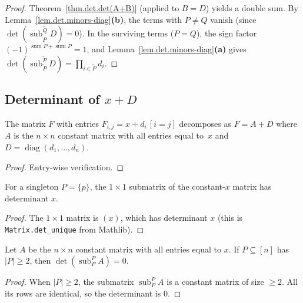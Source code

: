 \begin{proof}
Theorem~\ref{thm.det.det(A+B)} (applied to $B=D$) yields a double
sum. By Lemma~\ref{lem.det.minors-diag}\textbf{(b)}, the terms with
$P\ne Q$ vanish (since
$\det(\operatorname{sub}_{\widetilde{P}}^{\widetilde{Q}} D)=0$).
In the surviving terms ($P=Q$), the sign factor
$(-1)^{\operatorname{sum} P + \operatorname{sum} P} = 1$, and
Lemma~\ref{lem.det.minors-diag}\textbf{(a)} gives
$\det(\operatorname{sub}_{\widetilde{P}}^{\widetilde{P}} D)
= \prod_{i\in\widetilde{P}} d_i$.
\end{proof}

\subsection{Determinant of $x + D$}

\begin{lemma}
\label{lem.constPlusDiag.decomp}
\leanhelper
\leanok
The matrix $F$ with entries $F_{i,j} = x + d_i\,[i{=}j]$ decomposes as
$F = A + D$ where $A$ is the $n\times n$ constant matrix with all
entries equal to~$x$ and $D = \operatorname{diag}(d_1,\ldots,d_n)$.
\end{lemma}

\begin{proof}
\leanok
Entry-wise verification.
\end{proof}

\begin{lemma}
\label{lem.det.const.matrix.singleton}
\leanhelper
\leanok
For a singleton $P = \{p\}$, the $1\times 1$ submatrix of the
constant-$x$ matrix has determinant $x$.
\end{lemma}

\begin{proof}
\leanok
The $1\times 1$ matrix is $(x)$, which has determinant $x$
(this is \texttt{Matrix.det\_unique} from Mathlib).
\end{proof}

\begin{lemma}
\label{lem.det.const.matrix.zero}
\leanhelper
\leanok
Let $A$ be the $n\times n$ constant matrix with all entries equal to $x$.
If $P\subseteq [n]$ has $|P| \ge 2$, then
$\det(\operatorname{sub}_P^P A) = 0$.
\end{lemma}

\begin{proof}
\leanok
When $|P|\ge 2$, the submatrix $\operatorname{sub}_P^P A$ is a constant
matrix of size $\ge 2$. All its rows are identical, so
the determinant is $0$.
\end{proof}

